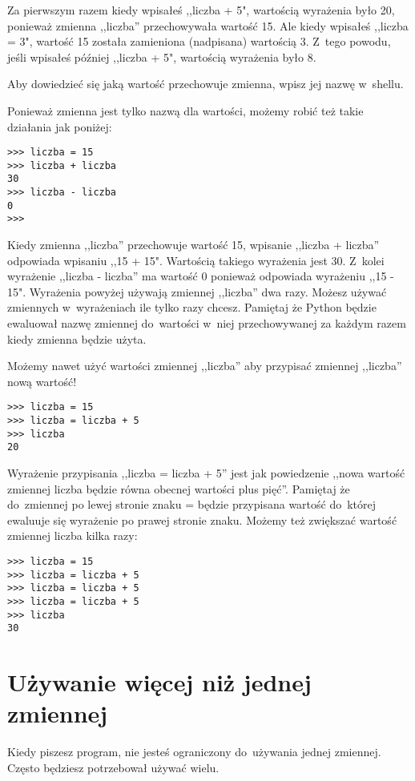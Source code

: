 \documentclass{book}
\begin{document}
Za pierwszym razem kiedy wpisałeś ,,liczba + 5", wartością wyrażenia było 20, ponieważ zmienna ,,liczba'' przechowywała wartość 15. Ale kiedy wpisałeś ,,liczba = 3", wartość 15 została zamieniona (nadpisana) wartością 3. Z~tego powodu, jeśli wpisałeś później ,,liczba + 5", wartością wyrażenia było 8.

Aby dowiedzieć się jaką wartość przechowuje zmienna, wpisz jej nazwę w~shellu.

Ponieważ zmienna jest tylko nazwą dla wartości, możemy robić też takie działania jak poniżej:

\begin{lstlisting}
>>> liczba = 15
>>> liczba + liczba
30
>>> liczba - liczba
0
>>> 
\end{lstlisting}

Kiedy zmienna ,,liczba'' przechowuje wartość 15, wpisanie ,,liczba + liczba'' odpowiada wpisaniu ,,15 + 15". Wartością takiego wyrażenia jest 30. Z~kolei wyrażenie ,,liczba - liczba'' ma wartość 0 ponieważ odpowiada wyrażeniu ,,15 - 15". Wyrażenia powyżej używają zmiennej ,,liczba'' dwa razy. Możesz używać zmiennych w~wyrażeniach ile tylko razy chcesz. Pamiętaj że Python będzie ewaluował nazwę zmiennej do~wartości w~niej przechowywanej za każdym razem kiedy zmienna będzie użyta.

Możemy nawet użyć wartości zmiennej ,,liczba'' aby przypisać zmiennej ,,liczba'' nową wartość!

\begin{lstlisting}
>>> liczba = 15
>>> liczba = liczba + 5
>>> liczba
20
\end{lstlisting}

Wyrażenie przypisania ,,liczba = liczba + 5'' jest jak powiedzenie ,,nowa wartość zmiennej liczba będzie równa obecnej wartości plus pięć''. Pamiętaj że do~zmiennej po lewej stronie znaku = będzie przypisana wartość do~której ewaluuje się wyrażenie po prawej stronie znaku. Możemy też zwiększać wartość zmiennej liczba kilka razy:

\begin{lstlisting}
>>> liczba = 15
>>> liczba = liczba + 5
>>> liczba = liczba + 5
>>> liczba = liczba + 5
>>> liczba
30
\end{lstlisting}

\section{Używanie więcej niż jednej zmiennej}

Kiedy piszesz program, nie jesteś ograniczony do~używania jednej zmiennej. Często będziesz potrzebował używać wielu.
\end{document}

